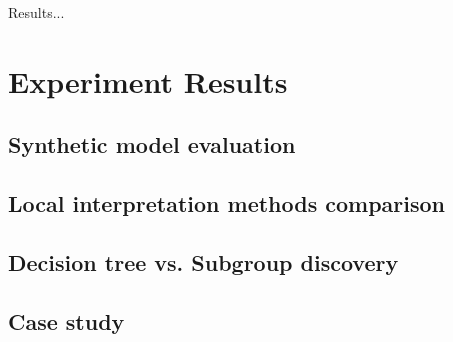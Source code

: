 Results...

\section{Experiment Results}


\subsection{Synthetic model evaluation}



\subsection{Local interpretation methods comparison}





\subsection{Decision tree vs. Subgroup discovery}

\subsection{Case study} 


%
